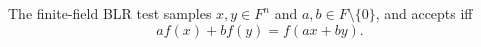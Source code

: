 \begin{definition}
\label{def:ff-blr-test}
\leanok
The finite-field BLR test samples $x,y \in F^n$ and
  $a,b \in F \setminus \{0\}$, and accepts iff
  \[
    a f(x) + b f(y) = f(ax + by).
  \]
\end{definition}
